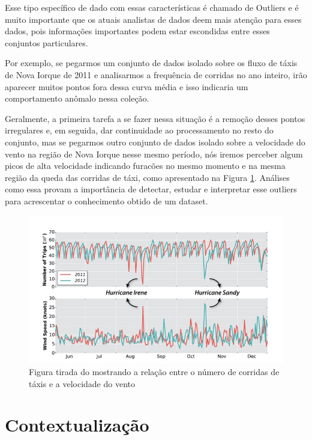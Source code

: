 Esse tipo específico de dado com essas características é chamado de Outliers e é muito importante que os atuais analistas de dados deem mais atenção para esses dados, pois informações importantes podem estar escondidas entre esses conjuntos particulares.

Por exemplo, se pegarmos um conjunto de dados isolado sobre os fluxo de táxis de Nova Iorque de 2011 e analisarmos a frequência de corridas no ano inteiro, irão aparecer muitos pontos fora dessa curva média e isso indicaria um comportamento anômalo nessa coleção.

Geralmente, a primeira tarefa a se fazer nessa situação é a remoção desses pontos irregulares e, em seguida, dar continuidade ao processamento no resto do conjunto, mas se pegarmos outro conjunto de dados isolado sobre a velocidade do vento na região de Nova Iorque nesse mesmo período, nós iremos perceber algum picos de alta velocidade indicando furacões no mesmo momento e na mesma região da queda das corridas de táxi, como apresentado na Figura \ref{fig:freire-paper-taxi-wind}. Análises como essa provam a importância de detectar, estudar e interpretar esse outliers para acrescentar o conhecimento obtido de um dataset.

\begin{figure}[t]
	\centering
	\includegraphics[width=\textwidth]{images/outlier-freire-figure-1}
	\caption{Figura tirada do \cite{DBLP:journals/debu/FreireCVZ16} mostrando a relação entre o número de corridas de táxis e a velocidade do vento}
	\label{fig:freire-paper-taxi-wind}
	\vspace{-10pt}
\end{figure}

\section{Contextualização}

